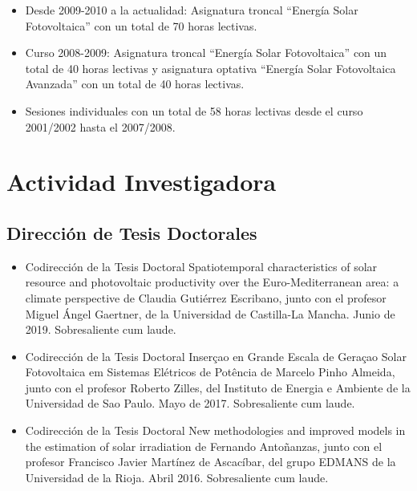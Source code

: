 \documentclass[article, a4paper]{memoir}
\begin{document}
\begin{itemize}
\item Desde 2009-2010 a la actualidad: Asignatura troncal ``Energía Solar Fotovoltaica'' con un total de 70 horas lectivas.

\item Curso 2008-2009: Asignatura troncal ``Energía Solar Fotovoltaica'' con un total de 40 horas lectivas y asignatura optativa ``Energía Solar Fotovoltaica Avanzada'' con un total de 40 horas lectivas.

\item Sesiones individuales con un total de 58 horas lectivas desde el curso 2001/2002 hasta el 2007/2008.
\end{itemize}


\section{Actividad Investigadora}
\label{sec:org36dfd09}
\subsection{Dirección de Tesis Doctorales}
\label{sec:org969e845}

\begin{itemize}
\item Codirección de la Tesis Doctoral \guillemotleft{}Spatiotemporal characteristics of solar resource and photovoltaic productivity over the Euro-Mediterranean area: a climate perspective\guillemotright{} de Claudia Gutiérrez Escribano, junto con el profesor Miguel Ángel Gaertner, de la Universidad de Castilla-La Mancha. Junio de 2019. Sobresaliente cum laude.

\item Codirección de la Tesis Doctoral \guillemotleft{}Inserçao en Grande Escala de Geraçao Solar Fotovoltaica em Sistemas Elétricos de Potência\guillemotright{} de Marcelo Pinho Almeida, junto con el profesor Roberto Zilles, del Instituto de Energia e Ambiente de la Universidad de Sao Paulo. Mayo de 2017. Sobresaliente cum laude.

\item Codirección de la Tesis Doctoral \guillemotleft{}New methodologies and improved models in the estimation of solar irradiation\guillemotright{} de Fernando Antoñanzas, junto con el profesor Francisco Javier Martínez de Ascacíbar, del grupo EDMANS de la Universidad de la Rioja. Abril 2016. Sobresaliente cum laude.
\end{itemize}
\end{document}
